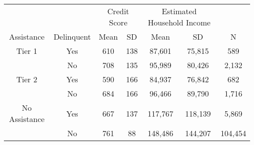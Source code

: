 \begin{tabular}{ccccccc}
\toprule 
\midrule 
 &  & \multicolumn{2}{c}{Credit Score} & \multicolumn{2}{c}{Estimated Household Income} \\
 \cmidrule(lr){3-4} \cmidrule(lr){5-6} 
Assistance & Delinquent & Mean & SD & Mean & SD & N \\
\midrule 
Tier 1 & Yes & 610 & 138 & 87,601 & 75,815 & 589 \\
 & No & 708 & 135 & 95,989 & 80,426 & 2,132 \\
\midrule 
Tier 2 & Yes & 590 & 166 & 84,937 & 76,842 & 682 \\
 & No & 684 & 166 & 96,466 & 89,790 & 1,716 \\
\midrule 
No Assistance & Yes & 667 & 137 & 117,767 & 118,139 & 5,869 \\
 & No & 761 & 88 & 148,486 & 144,207 & 104,454 \\
\midrule 
\bottomrule 
\end{tabular}
